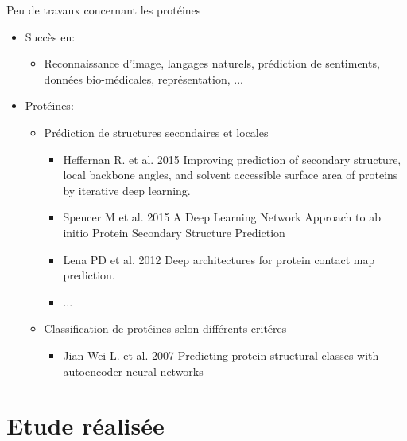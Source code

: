 \documentclass{beamer}
\begin{document}
\begin{frame}{Peu de travaux concernant les protéines}

      \begin{itemize}
      \item Succès en:\pause
        \begin{itemize}
        \item Reconnaissance d'image, langages naturels,
          prédiction de sentiments, données bio-médicales,
          représentation, ...\pause
        \end{itemize}
      \end{itemize}


      \begin{itemize}
      \item Protéines:
        \begin{itemize}
        \item Prédiction de structures secondaires et locales\pause
          \begin{itemize}
          \item Heffernan R. et al. 2015 Improving prediction of secondary
            structure, local backbone angles, and solvent accessible surface
            area of proteins by iterative deep learning. \pause
          \item Spencer M et al. 2015 A Deep Learning Network Approach to ab
            initio Protein Secondary Structure Prediction\pause
          \item Lena PD et al. 2012 Deep architectures for protein contact
            map prediction. \pause
          \item ...\pause
          \end{itemize}
        \item Classification de protéines selon différents critéres\pause
          \begin{itemize}
          \item Jian-Wei L. et al. 2007 Predicting protein structural classes with autoencoder neural networks
          \end{itemize}
        \end{itemize}
      \end{itemize}


\end{frame}

\section{Etude réalisée}
\end{document}
